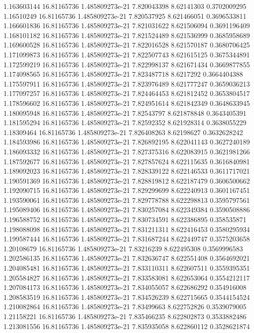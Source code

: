 {1.163603144 16.81165736 1.485809273e-21 7.820043398 8.62141303 0.3702009295
1.16510249 16.81165736 1.485809273e-21 7.820537925 8.621466051 0.3696533811
1.166601836 16.81165736 1.485809273e-21 7.821031622 8.621506094 0.3691196409
1.168101182 16.81165736 1.485809273e-21 7.821524489 8.621536999 0.3685958689
1.169600528 16.81165736 1.485809273e-21 7.822016528 8.621570187 0.3680706425
1.171099873 16.81165736 1.485809273e-21 7.822507743 8.621615125 0.3675344891
1.172599219 16.81165736 1.485809273e-21 7.822998137 8.621671434 0.3669877855
1.174098565 16.81165736 1.485809273e-21 7.823487718 8.6217292 0.3664404388
1.175597911 16.81165736 1.485809273e-21 7.823976489 8.621777247 0.3659036213
1.177097257 16.81165736 1.485809273e-21 7.824464453 8.621812452 0.3653804517
1.178596602 16.81165736 1.485809273e-21 7.824951614 8.621842349 0.3648633945
1.180095948 16.81165736 1.485809273e-21 7.82543797 8.621878848 0.3643405391
1.181595294 16.81165736 1.485809273e-21 7.82592352 8.621928314 0.3638055229
1.18309464 16.81165736 1.485809273e-21 7.826408263 8.62198627 0.3632628242
1.184593986 16.81165736 1.485809273e-21 7.826892195 8.622041143 0.3627240189
1.186093332 16.81165736 1.485809273e-21 7.827375316 8.622083915 0.3621981266
1.187592677 16.81165736 1.485809273e-21 7.827857624 8.622115635 0.3616840981
1.189092023 16.81165736 1.485809273e-21 7.828339122 8.622146533 0.3611717021
1.190591369 16.81165736 1.485809273e-21 7.828819812 8.622187479 0.3606500662
1.192090715 16.81165736 1.485809273e-21 7.829299699 8.622240913 0.3601167451
1.193590061 16.81165736 1.485809273e-21 7.829778788 8.622298813 0.3595797561
1.195089406 16.81165736 1.485809273e-21 7.830257084 8.622349384 0.3590508886
1.196588752 16.81165736 1.485809273e-21 7.830734591 8.622386895 0.358535871
1.198088098 16.81165736 1.485809273e-21 7.831211311 8.622416453 0.3580295934
1.199587444 16.81165736 1.485809273e-21 7.831687244 8.622449747 0.3575203658
1.20108679 16.81165736 1.485809273e-21 7.83216239 8.622495308 0.3569996583
1.202586135 16.81165736 1.485809273e-21 7.832636747 8.622551408 0.3564692021
1.204085481 16.81165736 1.485809273e-21 7.833110311 8.622607511 0.3559395351
1.205584827 16.81165736 1.485809273e-21 7.833583081 8.622653064 0.3554212117
1.207084173 16.81165736 1.485809273e-21 7.834055057 8.622686292 0.354916008
1.208583519 16.81165736 1.485809273e-21 7.834526239 8.622715665 0.3544154524
1.210082864 16.81165736 1.485809273e-21 7.83499663 8.622752826 0.3539079005
1.21158221 16.81165736 1.485809273e-21 7.835466235 8.622802873 0.3533882486
1.213081556 16.81165736 1.485809273e-21 7.835935058 8.622860112 0.3528621874
}
